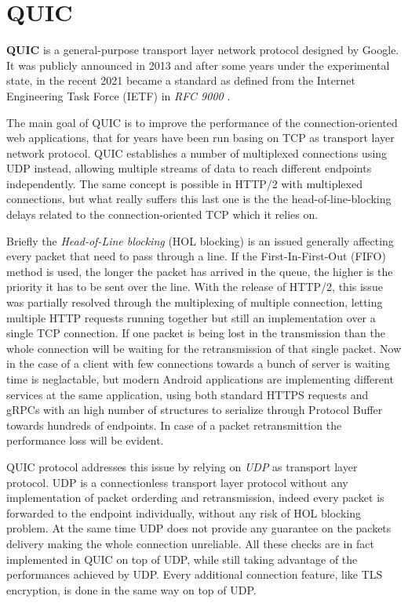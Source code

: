 	\section{QUIC}
		\par \textbf{QUIC} is a general-purpose transport layer network protocol designed by Google. It was publicly announced in 2013 and after some years under the experimental state, in the recent 2021 became a standard as defined from the Internet Engineering Task Force (IETF) in \textit{RFC 9000} \cite{rfc9000}.\newline
		\par The main goal of QUIC is to improve the performance of the connection-oriented web applications, that for years have been run basing on TCP as transport layer network protocol. QUIC establishes a number of multiplexed connections using UDP instead, allowing multiple streams of data to reach different endpoints independently. The same concept is possible in HTTP/2 with multiplexed connections, but what really suffers this last one is the the head-of-line-blocking delays related to the connection-oriented TCP which it relies on. \newline
		\par Briefly the \textit{Head-of-Line blocking} (HOL blocking) is an issued generally affecting every packet that need to pass through a line. If the First-In-First-Out (FIFO) method is used, the longer the packet has arrived in the queue, the higher is the priority it has to be sent over the line. With the release of HTTP/2, this issue was partially resolved through the multiplexing of multiple connection, letting multiple HTTP requests running together but still an implementation over a single TCP connection. If one packet is being lost in the transmission than the whole connection will be waiting for the retransmission of that single packet. Now in the case of a client with few connections towards a bunch of server is waiting time is neglactable, but modern Android applications are implementing different services at the same application, using both standard HTTPS requests and gRPCs with an high number of structures to serialize through Protocol Buffer towards hundreds of endpoints. In case of a packet retransmittion the performance loss will be evident.
		\par QUIC protocol addresses this issue by relying on \textit{UDP} as transport layer protocol. UDP is a connectionless transport layer protocol without any implementation of packet orderding and retransmission, indeed every packet is forwarded to the endpoint individually, without any risk of HOL blocking problem. At the same time UDP does not provide any guarantee on the packets delivery making the whole connection unreliable. All  these checks are in fact implemented in QUIC on top of UDP, while still taking advantage of the performances achieved by UDP. Every additional connection feature, like TLS encryption, is done in the same way on top of UDP. \newline
